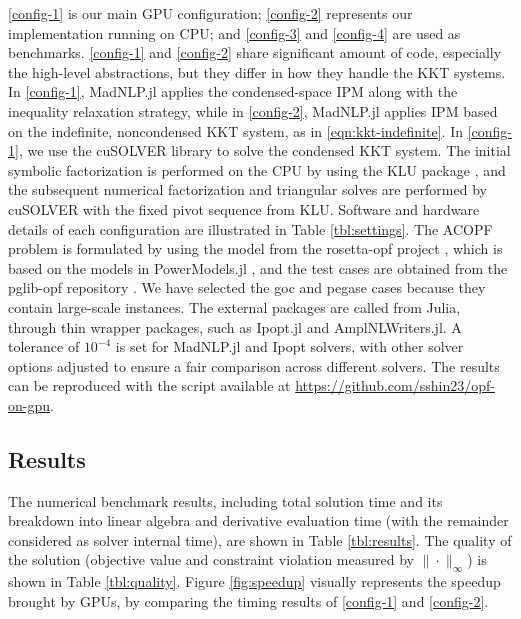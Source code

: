 \documentclass{IEEEtran4PSCC} %
\begin{document}
\ref{config-1} is our main GPU configuration; \ref{config-2}
represents our implementation running on CPU; and \ref{config-3} and
\ref{config-4} are used as benchmarks. \ref{config-1} and
\ref{config-2} share significant amount of code, especially the
high-level abstractions, but they differ in how they handle the KKT
systems. In \ref{config-1}, MadNLP.jl applies the condensed-space IPM
along with the inequality relaxation strategy, while in
\ref{config-2}, MadNLP.jl applies IPM based on the indefinite,
noncondensed KKT system, as in \eqref{eqn:kkt-indefinite}. In
\ref{config-1}, we use the cuSOLVER library to solve the condensed KKT
system. The initial symbolic factorization is performed on the CPU by using the KLU
package \cite{davis2010algorithm}, and the subsequent numerical
factorization and triangular solves are performed by cuSOLVER with the
fixed pivot sequence from KLU.  Software and hardware details of each
configuration are illustrated in Table \ref{tbl:settings}. The ACOPF
problem is formulated by using the model from the rosetta-opf project
\cite{rosetta-opf}, which is based on the models in PowerModels.jl \cite{8442948}, and the test cases are obtained from the pglib-opf
repository \cite{babaeinejadsarookolaee2019power}. We have selected
the goc and pegase cases because they contain large-scale instances.  The
external packages are called from Julia, through thin wrapper
packages, such as Ipopt.jl and AmplNLWriters.jl. A tolerance of
$10^{-4}$ is set for MadNLP.jl and Ipopt solvers, with other solver
options adjusted to ensure a fair comparison across different
solvers. The results can be reproduced with the script available at
\url{https://github.com/sshin23/opf-on-gpu}.

\subsection{Results}

The numerical benchmark results, including total solution time and its
breakdown into linear algebra and derivative evaluation time (with the
remainder considered as solver internal time), are shown in Table
\ref{tbl:results}. The quality of the solution (objective value and
constraint violation measured by $\|\cdot\|_\infty$) is shown in Table
\ref{tbl:quality}. Figure \ref{fig:speedup} visually represents the
speedup brought by GPUs, by comparing the timing results of
\ref{config-1} and \ref{config-2}.
\end{document}
